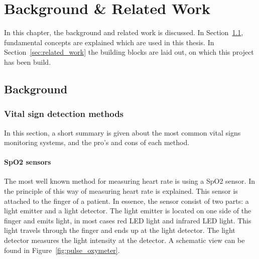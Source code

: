 \chapter{Background \& Related Work}
\label{chp:background}

In this chapter, the background and related work is discussed. In Section~\ref{sec:background}, fundamental concepts are explained which are used in this thesis. In Section~\ref{sec:related_work} the building blocks are laid out, on which this project has been build.

\section{Background}
\label{sec:background}
\subsection{Vital sign detection methods}
In this section, a short summary is given about the most common vital signs monitoring systems, and the pro's and cons of each method.


\subsubsection{SpO2 sensors}
The most well known method for measuring heart rate is using a SpO2 sensor. In \cite{sinex1999pulse} the principle of this way of measuring heart rate is explained. This sensor is attached to the finger of a patient. In essence, the sensor consist of two parts: a light emitter and a light detector. The light emitter is located on one side of the finger and emits light, in most cases red LED light and infrared LED light. This light travels through the finger and ends up at the light detector. The light detector measures the light intensity at the detector. A schematic view can be found in Figure~\ref{fig:pulse_oxymeter}. 

